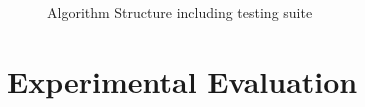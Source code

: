 \documentclass[12pt]{article}
\begin{document}
\begin{figure}[H]
\caption{Algorithm Structure including testing suite}
\end{figure}
 
\section{Experimental Evaluation}
\end{document}
